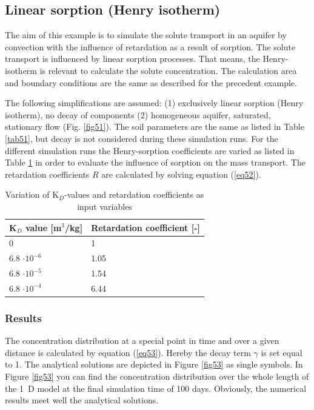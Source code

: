 \subsection{Linear sorption (Henry isotherm)}

The aim of this example is to simulate the solute transport in an aquifer by convection with the influence of retardation as a result of sorption. The solute transport is influenced by linear sorption processes. That means, the Henry-isotherm is relevant to calculate the solute concentration. The calculation area and boundary conditions are the same as described for the precedent example.

The following simplifications are assumed: (1) exclusively linear sorption (Henry isotherm), no decay of components (2) homogeneous aquifer, saturated, stationary flow (Fig. \ref{fig51}).
%
The soil parameters are the same as listed in Table \ref{tab51}, but decay is not considered during these simulation runs. For the different simulation runs the Henry-sorption coefficients are varied as listed in Table \ref{tab52} in order to evaluate the influence of sorption on the mass transport. The retardation coefficients $R$ are calculated by solving equation (\ref{eq52}).

\begin{table}[h]%
\begin{center}
\begin{tabular}{ll}
\toprule
K$_D$ value [m$^3$/kg] & Retardation coefficient [-] \\
\midrule
0  & 1  \\			
6.8 $\cdot 10^{-6}$ & 1.05 \\
6.8 $\cdot 10^{-5}$ & 1.54  \\
6.8 $\cdot 10^{-4}$ & 6.44  \\
\bottomrule
\end{tabular}
\caption{Variation of K$_D$-values and retardation coefficients as input variables}
\label{tab52}
\end{center}
\end{table}

\subsubsection{Results}

The concentration distribution at a special point in time and over a given distance is calculated by equation (\ref{eq53}). Hereby the decay term $\gamma$ is set equal to 1. The analytical solutions are depicted in Figure \ref{fig53} as single symbols.
%
In Figure \ref{fig53} you can find the concentration distribution over the whole length of the 1~D model at the final simulation time of 100 days. Obviously, the numerical results meet well the analytical solutions.

